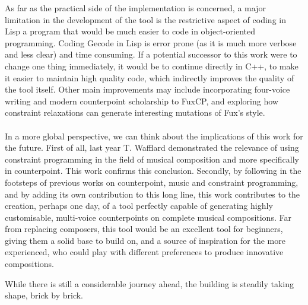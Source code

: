 As far as the practical side of the implementation is concerned, a major limitation in the development of the tool is the restrictive aspect of coding in Lisp a program that would be much easier to code in object-oriented programming. Coding Gecode in Lisp is error prone (as it is much more verbose and less clear) and time consuming. If a potential successor to this work were to change one thing immediately, it would be to continue directly in C++, to make it easier to maintain high quality code, which indirectly improves the quality of the tool itself. Other main improvements may include incorporating four-voice writing and modern counterpoint scholarship to FuxCP, and exploring how constraint relaxations can generate interesting mutations of Fux's style.
\paragraph{}
In a more global perspective, we can think about the implications of this work for the future.
First of all, last year T. Wafflard demonstrated the relevance of using constraint programming in the field of musical composition and more specifically in counterpoint. This work confirms this conclusion.
Secondly, by following in the footsteps of previous works on counterpoint, music and constraint programming, and by adding its own contribution to this long line, this work contributes to the creation, perhaps one day, of a tool perfectly capable of generating highly customisable, multi-voice counterpoints on complete musical compositions. Far from replacing composers, this tool would be an excellent tool for beginners, giving them a solid base to build on, and a source of inspiration for the more experienced, who could play with different preferences to produce innovative compositions.

While there is still a considerable journey ahead, the building is steadily taking shape, brick by brick.
